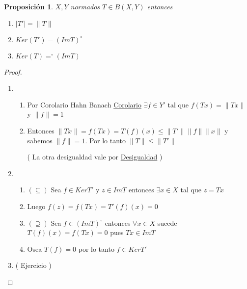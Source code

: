 \documentclass[10pt]{extarticle}
\theoremstyle{break}
\newtheorem{proposition}{Proposición}
\theoremstyle{definition}
\begin{document}
\begin{proposition}
	$X,Y$ normados $T\in B( X,Y )$ entonces
	\begin{enumerate}
		\item $ \lvert T' \rvert =\lVert T \rVert  $ 
		\item $ Ker( T')=( Im T)^{\circ}  $ 
		\item $ Ker( T)=^{\circ}( Im T)  $  
	\end{enumerate}
\end{proposition}
\begin{proof} 
	\begin{enumerate}
		\item 
			\begin{enumerate}
				\item Por Corolario Hahn Banach \hyperref[10.0]{Corolario}  $ \exists f\in Y' $ tal que $ f( Tx)=\lVert Tx \rVert  $ y $ \lVert f \rVert =1$ 
				\item Entonces $ \lVert Tx \rVert =f( Tx)=T( f)( x)\leq \lVert T' \rVert \lVert f \rVert \lVert x \rVert$ y sabemos $ \lVert f \rVert =1 $. Por lo tanto $ \lVert T \rVert \leq \lVert T' \rVert  $ 

					( La otra desigualdad vale por \hyperref[des]{Desigualdad} )    
			\end{enumerate}
		\item \begin{enumerate}
				\item $ ( \subseteq ) $  Sea $ f\in Ker T'  $ y $ z\in Im T  $ entonces $ \exists x\in X  $ tal que $ z=Tx$   
			\item Luego $ f( z)=f( Tx)=T'( f)( x) =0$
			\item $ ( \supseteq) $ Sea $ f\in ( ImT)^{\circ}   $ entonces $ \forall x\in X  $ sucede $ T( f)( x)=f( Tx)=0 $ pues $ Tx\in ImT  $ 
			\item Osea $ T( f)=0 $ por lo tanto $ f\in KerT'$ 
		\end{enumerate}  
	\item ( Ejercicio )
	\end{enumerate} 
	
\end{proof}
\end{document}

